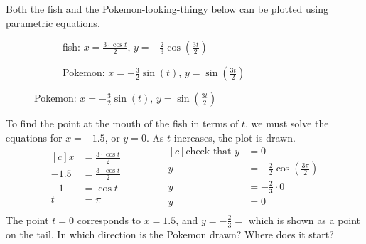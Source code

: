 Both the fish and the Pokemon-looking-thingy below can be plotted using parametric equations.
\begin{figure}[H]
	\begin{subfigure}[b]{0.5\textwidth}
		\centering
		  \caption{fish: $\displaystyle x=\frac{3\cdot\cos t}{2},\, y=-\frac{2}{3}\cos\left(\frac{3t}{2}\right)$}
	\end{subfigure}
	\begin{subfigure}[b]{0.5\textwidth}
		\centering
		  \caption{Pokemon: $\displaystyle x=-\frac{3}{2}\sin(t),\,y=\sin\left(\frac{3t}{2}\right)$}
	\end{subfigure}
\end{figure}
To find the point at the mouth of the fish in terms of $t$, we must solve the equations for $x=-1.5$, or $y=0$. As $t$ increases, the plot is drawn. 
\begin{equation*}
	\begin{aligned}[c]
x&=\frac{3\cdot\cos t}{2}\\
-1.5&=\frac{3\cdot\cos t}{2}\\
-1&=\cos t \\
t&=\pi\\
	\end{aligned}\qquad\qquad
	\begin{aligned}[c]
	 \text{check that }y&=0\\
	 y&=-\frac{2}{2}\cos\left(\frac{3\pi}{2}\right)\\
	y&=-\frac{2}{3}\cdot 0\\
	y&=0\\
	\end{aligned}
\end{equation*}
The point $t=0$ corresponds to $x=1.5$, and $y=-\frac{2}{3}=$ which is shown as a point on the tail.
\exercise In which direction is the Pokemon drawn? Where does it start?\\
